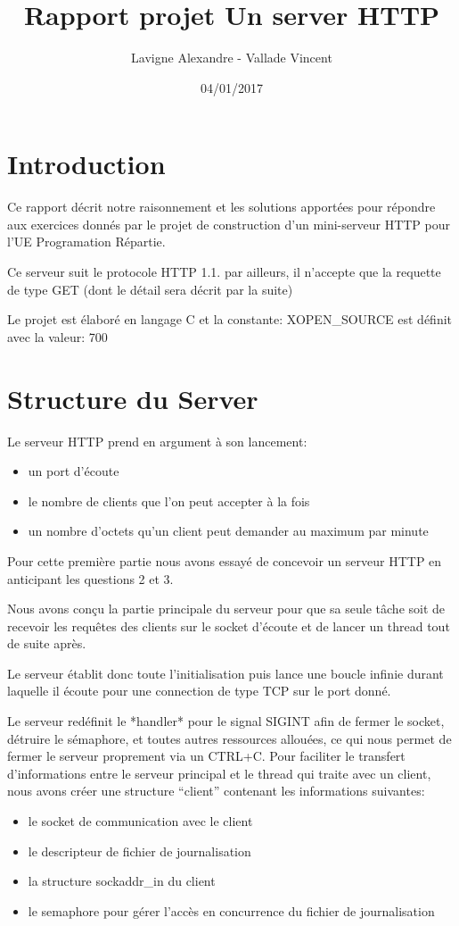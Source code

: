 \documentclass{article}
\title{Rapport projet Un server HTTP}
\author{Lavigne Alexandre - Vallade Vincent}
\date{04/01/2017}
\begin{document}
\maketitle

\section*{Introduction}

Ce rapport décrit notre raisonnement et les solutions apportées pour répondre aux exercices donnés
par le projet de construction d'un mini-serveur HTTP pour l'UE Programation Répartie.\hbox{}

Ce serveur suit le protocole HTTP 1.1. par ailleurs, il n'accepte que la requette de type GET (dont le détail sera décrit par la suite)\hbox{}

Le projet est élaboré en langage C et la constante: XOPEN\_SOURCE est définit avec la valeur: 700



\section{Structure du Server}

Le serveur HTTP prend en argument à son lancement:
\begin{itemize}
\item un port d'écoute
\item le nombre de clients que l'on peut accepter à la fois
\item un nombre d'octets qu'un client peut demander au maximum par minute
\end{itemize}

Pour cette première partie nous avons essayé de concevoir un serveur HTTP en anticipant les questions 2 et 3.\hbox{}

Nous avons conçu la partie principale du serveur pour que sa seule tâche soit de recevoir les requêtes des clients sur le socket d'écoute et de lancer un thread tout de suite après.\hbox{}

Le serveur établit donc toute l'initialisation puis lance une boucle infinie durant laquelle il écoute pour une connection de type TCP sur le port donné.
\hbox{}

Le serveur redéfinit le *handler* pour le signal SIGINT afin de fermer le socket, détruire le sémaphore, et toutes autres ressources allouées, ce qui nous permet de fermer le serveur proprement via un CTRL+C.
Pour faciliter le transfert d'informations entre le serveur principal et le thread qui traite avec un client, nous avons créer une structure ``client'' contenant les informations suivantes:
\begin{itemize}
\item le socket de communication avec le client
\item le descripteur de fichier de journalisation
\item la structure sockaddr\_in du client
\item le semaphore pour gérer l'accès en concurrence du fichier de journalisation
\end{itemize}
\end{document}
